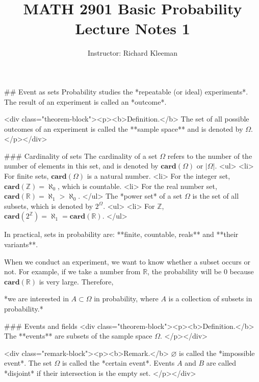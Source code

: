 


\title{MATH 2901 Basic Probability Lecture Notes 1}
\author{Instructor: Richard Kleeman}
\date{}
\maketitle


## Event as sets
Probability studies the *repeatable (or ideal) experiments*. The result of an experiment is called an *outcome*.

<div class="theorem-block"><p><b>Definition.</b> 
The set of all possible outcomes of an experiment is called the **sample space** and is denoted by $\Omega$.  
</p></div>

### Cardinality of sets
The cardinality of a set $\Omega$ refers to the number of the number of elements in this set, and is denoted by $\mathbf{card}(\Omega)$ or $\left\vert \Omega \right\vert$.
<ul>
    <li> For finite sets, $\mathbf{card}(\Omega)$ is a natural number.
    <li> For the integer set, $\mathbf{card}(\mathbb{Z}) = \aleph_0$, which is countable.
    <li> For the real number set, $\mathbf{card}(\mathbb{R}) = \aleph_1 > \aleph_0$.
</ul>
The *power set* of a set $\Omega$ is the set of all subsets, which is denoted by $2^\Omega$.
<ul>
    <li> For $\mathbb{Z}$, $\mathbf{card}(2^\mathbb{Z}) = \aleph_1 = \mathbf{card}(\mathbb{R})$.
</ul>

In practical, sets in probability are: **finite, countable, reals** and **their variants**.

When we conduct an experiment, we want to know whether a subset occurs or not. For example, if we take a number from $\mathbb{R}$, the probability will be 0 because $\mathbf{card}(\mathbb{R})$ is very large. Therefore,
\begin{center}
*we are interested in $A \subset \Omega$ in probability, where $A$ is a collection of subsets in probability.*
\end{center}

### Events and fields
<div class="theorem-block"><p><b>Definition.</b> 
The **events** are subsets of the sample space $\Omega$. 
</p></div>

<div class="remark-block"><p><b>Remark.</b> 
$\varnothing$ is called the *impossible event*. The set $\Omega$ is called the *certain event*. Events $A$ and $B$ are called *disjoint* if their intersection is the empty set.
</p></div>

